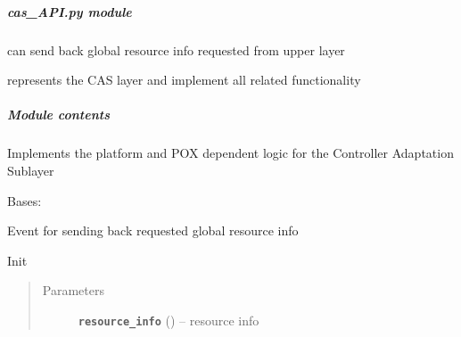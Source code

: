 \documentclass[letterpaper,10pt,english]{sphinxmanual}
\begin{document}
\subparagraph{\emph{cas\_API.py} module}
\label{adapt/cas_API:cas-api-py-module}\label{adapt/cas_API::doc}
{\hyperref[adapt/cas_API:escape.adapt.cas_API.GlobalResInfoEvent]{\emph{}}} can send back global resource info requested from
upper layer

{\hyperref[adapt/cas_API:escape.adapt.cas_API.ControllerAdaptationAPI]{\emph{}}} represents the CAS layer and implement all
related functionality


\subparagraph{Module contents}
\label{adapt/cas_API:module-escape.adapt.cas_API}\label{adapt/cas_API:module-contents}
Implements the platform and POX dependent logic for the Controller Adaptation
Sublayer

\begin{fulllineitems}
\label{adapt/cas_API:escape.adapt.cas_API.GlobalResInfoEvent}
Bases: 

Event for sending back requested global resource info

\begin{fulllineitems}
\label{adapt/cas_API:escape.adapt.cas_API.GlobalResInfoEvent.__init__}
Init
\begin{quote}\begin{description}
\item[{Parameters}] \leavevmode
\textbf{\texttt{resource\_info}} ({\hyperref[orchest/virtualization_mgmt:escape.orchest.virtualization_mgmt.ESCAPEVirtualizer]{\emph{}}}) -- resource info

\end{description}\end{quote}

\end{fulllineitems}


\end{fulllineitems}

\end{document}
